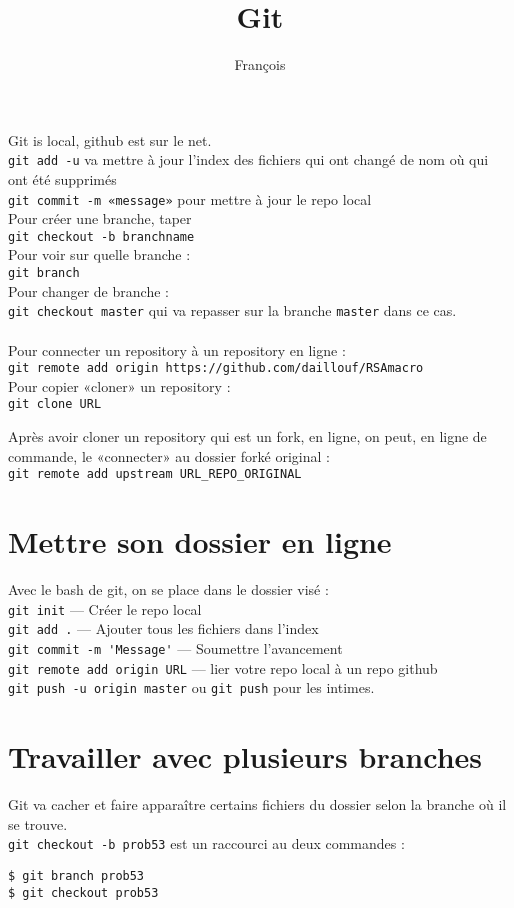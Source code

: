 \documentclass{article}
\begin{document}
\title{Git}

\author{François}
\maketitle

Git is local, github est sur le net.\\
\verb!git add -u! va mettre à jour l'index des fichiers qui ont changé de nom où qui ont été supprimés \\
\verb!git commit -m «message»! pour mettre à jour le repo local \\
Pour créer une branche, taper \\
\verb!git checkout -b branchname!\\
Pour voir sur quelle branche :\\
\verb!git branch!\\
Pour changer de branche :\\
\verb!git checkout master! qui va repasser sur la branche \verb!master! dans ce cas.\\
\\
Pour connecter un repository à un repository en ligne :\\
\verb!git remote add origin https://github.com/daillouf/RSAmacro!\\

Pour copier «cloner» un repository :\\
\verb!git clone URL!

Après avoir cloner un repository qui est un fork, en ligne, on peut, en ligne de commande, le «connecter» au dossier forké original : \\
\verb!git remote add upstream URL_REPO_ORIGINAL!\\

\section{Mettre son dossier en ligne}
Avec le bash de git, on se place dans le dossier visé :\\
\verb!git init! — Créer le repo local\\
\verb!git add .! — Ajouter tous les fichiers dans l'index\\
\verb!git commit -m 'Message'! —  Soumettre l'avancement\\
\verb!git remote add origin URL! —  lier votre repo local à un repo github\\
\verb!git push -u origin master! ou \verb!git push! pour les intimes.\\
 \section{Travailler avec plusieurs branches}
 Git va cacher et faire apparaître certains fichiers du dossier selon la branche où il se trouve.\\
\verb!git checkout -b prob53! est un raccourci au deux commandes :\\
\begin{verbatim}
$ git branch prob53
$ git checkout prob53
\end{verbatim}
\end{document}
